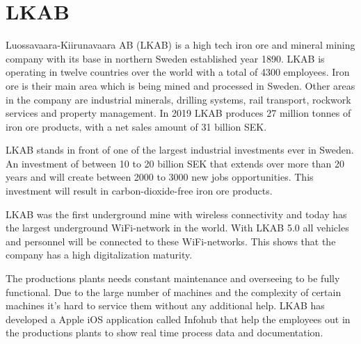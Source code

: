 \section{LKAB}
Luossavaara-Kiirunavaara AB (LKAB) is a high tech iron ore and mineral mining company with its base in northern Sweden established year 1890.
LKAB is operating in twelve countries over the world with a total of 4300 employees.
Iron ore is their main area which is being mined and processed in Sweden.
Other areas in the company are industrial minerals, drilling systems, rail transport, rockwork services and property management.
In 2019 LKAB produces 27 million tonnes of iron ore products, with a net sales amount of 31 billion SEK. \cite{LKABBrief} 

\bigskip

LKAB stands in front of one of the largest industrial investments ever in Sweden.
An investment of between 10 to 20 billion SEK that extends over more than 20 years and will create between 2000 to 3000 new jobs opportunities.
This investment will result in carbon-dioxide-free iron ore products. \cite{LKABInvestment}

\bigskip

LKAB was the first underground mine with wireless connectivity and today has the largest underground WiFi-network in the world.
With LKAB 5.0 all vehicles and personnel will be connected to these WiFi-networks.
This shows that the company has a high digitalization maturity. \cite{LKABITDevelopment}

\bigskip



The productions plants needs constant maintenance and overseeing to be fully functional.
Due to the large number of machines and the complexity of certain machines it's hard to service them without any additional help.
LKAB has developed a Apple iOS application called Infohub that help the employees out in the productions plants to show real time process data and documentation.

